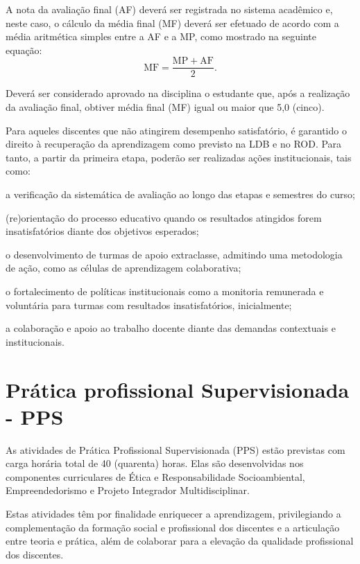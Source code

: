 \documentclass[
	12pt,				%
	openright,			%
	twoside,			%
	a4paper,			%
	chapter=TITLE,		%
	english,			%
	french,				%
	spanish,			%
	brazil,				%
	]{abntex2}
\begin{document}
A nota da avaliação final (AF) deverá ser registrada no sistema acadêmico e, neste caso, o cálculo da média final (MF) deverá ser efetuado de acordo com a média aritmética simples entre a AF e a MP, como mostrado na seguinte equação:
\[
    \mathrm{MF} = \frac{ \mathrm{MP} + \mathrm{AF}}{2}.
\]

Deverá ser considerado aprovado na disciplina o estudante que, após a realização da avaliação final, obtiver média final (MF) igual ou maior que 5,0 (cinco).

Para aqueles discentes que não atingirem desempenho satisfatório, é garantido o direito à recuperação da aprendizagem como previsto na LDB e no ROD. Para tanto, a partir da primeira etapa, poderão ser realizadas ações institucionais, tais como:
\begin{alineas}
	\item a verificação da sistemática de avaliação ao longo das etapas e semestres do curso;
 	\item (re)orientação do processo educativo quando os resultados atingidos forem insatisfatórios diante dos objetivos esperados;
 	\item o desenvolvimento de turmas de apoio extraclasse, admitindo uma metodologia de ação, como as células de aprendizagem colaborativa;
 	\item o fortalecimento de políticas institucionais como a monitoria remunerada e voluntária para turmas com resultados insatisfatórios, inicialmente;
 	\item a colaboração e apoio ao trabalho docente diante das demandas contextuais e institucionais.
\end{alineas}



\chapter{Prática profissional Supervisionada - PPS}
As atividades de Prática Profissional Supervisionada (PPS) estão previstas
com carga horária total de 40 (quarenta) horas. Elas são desenvolvidas nos
componentes curriculares de Ética e Responsabilidade Socioambiental, Empreendedorismo e Projeto Integrador Multidisciplinar.

Estas atividades têm por finalidade enriquecer a aprendizagem, privilegiando a
complementação da formação social e profissional dos discentes e a articulação
entre teoria e prática, além de colaborar para a elevação da qualidade
profissional dos discentes.
\end{document}
